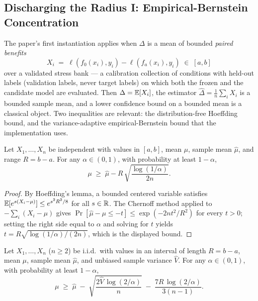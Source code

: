 \subsection{Discharging the Radius I: Empirical-Bernstein Concentration}
\label{sec:t2-eb}

The paper's first instantiation applies when $\Delta$ is a mean of bounded
\emph{paired benefits}
\[
X_i \;=\; \ell(f_0(x_i),y_i)-\ell(f_a(x_i),y_i)\;\in\;[a,b]
\]
over a validated stress bank --- a calibration collection of conditions with held-out
labels (validation labels, never target labels) on which both the frozen and the
candidate model are evaluated. Then $\Delta=\mathbb{E}[X_i]$, the estimator
$\widehat\Delta=\tfrac1n\sum_iX_i$ is a bounded sample mean, and a lower confidence
bound on a bounded mean is a classical object. Two inequalities are relevant: the
distribution-free Hoeffding bound, and the variance-adaptive empirical-Bernstein bound
that the implementation uses.

\begin{lemma}
\label{sec:t2-lem-hoeffding}
Let $X_1,\dots,X_n$ be independent with values in $[a,b]$, mean $\mu$, sample mean
$\widehat\mu$, and range $R=b-a$. For any $\alpha\in(0,1)$, with probability at least
$1-\alpha$,
\[
\mu\;\ge\;\widehat\mu - R\,\sqrt{\frac{\log(1/\alpha)}{2n}} .
\]
\end{lemma}

\begin{proof}
By Hoeffding's lemma, a bounded centered variable satisfies
$\mathbb{E}[e^{s(X_i-\mu)}]\le e^{s^2R^2/8}$ for all $s\in\mathbb{R}$. The Chernoff method applied to
$-\sum_i(X_i-\mu)$ gives
$\Pr[\widehat\mu-\mu\le -t]\le\exp(-2nt^2/R^2)$ for every $t>0$; setting the right side
equal to $\alpha$ and solving for $t$ yields
$t=R\sqrt{\log(1/\alpha)/(2n)}$, which is the displayed bound. \qedhere
\end{proof}

\begin{lemma}
\label{sec:t2-lem-eb}
Let $X_1,\dots,X_n$ ($n\ge2$) be i.i.d.\ with values in an interval of length $R=b-a$,
mean $\mu$, sample mean $\widehat\mu$, and unbiased sample variance $\widehat V$. For
any $\alpha\in(0,1)$, with probability at least $1-\alpha$,
\[
\mu\;\ge\;\widehat\mu
\;-\;\sqrt{\frac{2\widehat V\,\log(2/\alpha)}{n}}
\;-\;\frac{7R\,\log(2/\alpha)}{3(n-1)} .
\]
\end{lemma}


